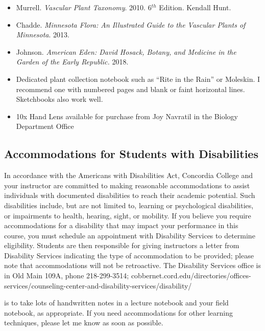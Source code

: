 \documentclass{tufte-handout}
\begin{document}
\begin{fullwidth}
\begin{itemize}
	\item Murrell. \emph{Vascular Plant Taxonomy}. 2010. 6$^{th}$ Edition. Kendall Hunt.
	\item Chadde. \emph{Minnesota Flora: An Illustrated Guide to the Vascular Plants of Minnesota}. 2013. 
	\item Johnson. \emph{American Eden: David Hosack, Botany, and Medicine in the Garden of the Early Republic.} 2018.
	\item Dedicated plant collection notebook such as ``Rite in the Rain'' or Moleskin. I recommend one with numbered pages and blank or faint horizontal lines. Sketchbooks also work well.
	\item 10x Hand Lens available for purchase from Joy Navratil in the Biology Department Office
\end{itemize}


\subsection{Accommodations for Students with Disabilities}

In accordance with the Americans with Disabilities Act, Concordia College and your instructor are committed to making reasonable accommodations to assist individuals with documented disabilities to reach their academic potential. Such disabilities include, but are not limited to, learning or psychological disabilities, or impairments to health, hearing, sight, or mobility. If you believe you require accommodations for a disability that may impact your performance in this course, you must schedule an appointment with Disability Services to determine eligibility. Students are then responsible for giving instructors a letter from Disability Services indicating the type of accommodation to be provided; please note that accommodations will not be retroactive. The Disability Services office is in Old Main 109A, phone 218-299-3514; cobbernet.cord.edu/directories/offices-services/counseling-center-and-disability-services/disability/

 is to take lots of handwritten notes in a lecture notebook and your field notebook, as appropriate. If you need accommodations for other learning techniques, please let me know as soon as possible. 


\end{fullwidth}
\end{document}

